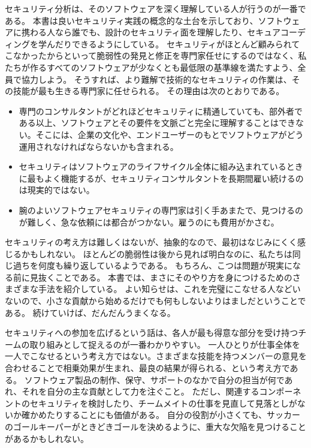 \documentclass[uplatex]{jsarticle}
\begin{document}
セキュリティ分析は、そのソフトウェアを深く理解している人が行うのが一番である。
本書は良いセキュリティ実践の概念的な土台を示しており、ソフトウェアに携わる人なら誰でも、設計のセキュリティ面を理解したり、セキュアコーディングを学んだりできるようにしている。
セキュリティがほとんど顧みられてこなかったからといって脆弱性の発見と修正を専門家任せにするのではなく、私たちが作るすべてのソフトウェアが少なくとも最低限の基準線を満たすよう、全員で協力しよう。
そうすれば、より難解で技術的なセキュリティの作業は、その技能が最も生きる専門家に任せられる。
その理由は次のとおりである。
\begin{itemize}
\item 専門のコンサルタントがどれほどセキュリティに精通していても、部外者である以上、ソフトウェアとその要件を文脈ごと完全に理解することはできない。そこには、企業の文化や、エンドユーザーのもとでソフトウェアがどう運用されなければならないかも含まれる。
\item セキュリティはソフトウェアのライフサイクル全体に組み込まれているときに最もよく機能するが、セキュリティコンサルタントを長期間雇い続けるのは現実的ではない。
\item 腕のよいソフトウェアセキュリティの専門家は引く手あまたで、見つけるのが難しく、急な依頼には都合がつかない。雇うのにも費用がかさむ。
\end{itemize}

セキュリティの考え方は難しくはないが、抽象的なので、最初はなじみにくく感じるかもしれない。
ほとんどの脆弱性は後から見れば明白なのに、私たちは同じ過ちを何度も繰り返しているようである。
もちろん、こつは問題が現実になる前に見抜くことである。
本書では、まさにそのやり方を身につけるためのさまざまな手法を紹介している。
よい知らせは、これを完璧にこなせる人などいないので、小さな貢献から始めるだけでも何もしないよりはましだということである。
続けていけば、だんだんうまくなる。

セキュリティへの参加を広げるという話は、各人が最も得意な部分を受け持つチームの取り組みとして捉えるのが一番わかりやすい。
一人ひとりが仕事全体を一人でこなせるという考え方ではない。さまざまな技能を持つメンバーの意見を合わせることで相乗効果が生まれ、最良の結果が得られる、という考え方である。
ソフトウェア製品の制作、保守、サポートのなかで自分の担当が何であれ、それを自分の主な貢献として力を注ぐこと。
ただし、関連するコンポーネントのセキュリティを検討したり、チームメイトの仕事を見直して見落としがないか確かめたりすることにも価値がある。
自分の役割が小さくても、サッカーのゴールキーパーがときどきゴールを決めるように、重大な欠陥を見つけることがあるかもしれない。
\end{document}
